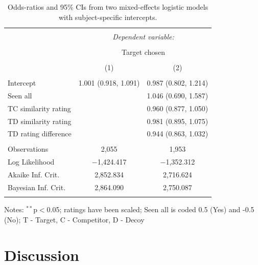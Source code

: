 \documentclass[12pt, a4paper]{article}
\begin{document}
\begin{table}[htb] \centering
  \begin{threeparttable}
    \captionsetup{justification=centering}
    \caption{Odds-ratios and 95\% CIs from two mixed-effects logistic models with subject-specific intercepts.}
  \label{latentattr_exp2reg} 
\begin{tabular}{@{\extracolsep{5pt}}lcc} 
\\[-1.8ex]\hline 
\hline \\[-1.8ex] 
 & \multicolumn{2}{c}{\textit{Dependent variable:}} \\ 
\cline{2-3} 
\\[-1.8ex] & \multicolumn{2}{c}{Target chosen} \\ 
\\[-1.8ex] & (1) & (2)\\ 
\hline \\[-1.8ex] 
 Intercept & 1.001 (0.918, 1.091) & 0.987 (0.802, 1.214) \\ 
  Seen all &  & 1.046 (0.690, 1.587) \\ 
  TC similarity rating &  & 0.960 (0.877, 1.050) \\ 
  TD similarity rating &  & 0.981 (0.895, 1.075) \\ 
  TD rating difference &  & 0.944 (0.863, 1.032) \\ 
 \hline \\[-1.8ex] 
Observations & 2,055 & 1,953 \\ 
Log Likelihood & $-$1,424.417 & $-$1,352.312 \\ 
Akaike Inf. Crit. & 2,852.834 & 2,716.624 \\ 
Bayesian Inf. Crit. & 2,864.090 & 2,750.087 \\ 
\hline 
\hline \\[-1.8ex] 
\end{tabular} 
    \begin{tablenotes}
      \small
      \item Notes: $^{**}$p$<$0.05; ratings have been scaled; Seen all is coded 0.5 (Yes) and -0.5 (No); T - Target, C - Competitor, D - Decoy
    \end{tablenotes}
  \end{threeparttable}
\end{table}


\section{Discussion}
\end{document}
